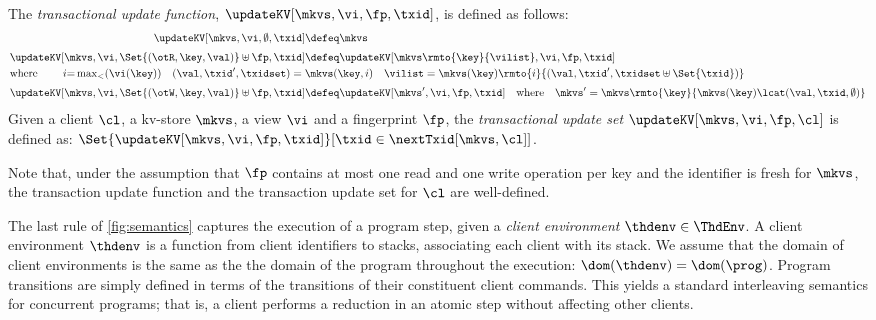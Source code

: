 \begin{definition}
\label{eq:updatekv}
\label{def:updatekv}
The \emph{transactional update function},  $\updateKV[\mkvs, \vi, \fp, \txid]$,  is
defined as follows:
%
{%
\[%
\begin{aligned}
    \updateKV[\mkvs, \vi, \emptyset, \txid] & \defeq \mkvs 
    \\[3pt]
    \updateKV[\mkvs, \vi, \Set{(\otR, \key, \val)} \uplus \fp, \txid]
    & \defeq \updateKV[\mkvs\rmto{\key}{\vilist},\vi, \fp, \txid] \\
    \omit\rlap{where \qquad \( i {=} \max_{<}(\vi(\key)) \quad (\val, \txid', \txidset) = \mkvs(\key, i) 
            \quad \vilist = \mkvs(\key)\rmto{i}{(\val, \txid', \txidset \uplus \Set{ \txid })}\)} 
    \\[3pt]
%	
	\updateKV[\mkvs, \vi, \Set{(\otW, \key, \val)} \uplus \fp, \txid] 
    & \defeq \updateKV[\mkvs', \vi, \fp, \txid] \quad \text{where} \quad  \mkvs' = \mkvs\rmto{\key}{ \mkvs(\key) \lcat (\val, \txid, \emptyset) } \\
\end{aligned}
\]%
}%
%
Given a client $\cl$, a kv-store $\mkvs$, a view $\vi$ and a fingerprint $\fp$, 
the \emph{transactional update set} $\updateKV[\mkvs, \vi, \fp, \cl]$ is defined as:  
\(\Set{\updateKV[\mkvs, \vi, \fp, \txid]}[\txid \in \nextTxid[\mkvs, \cl]]\).
\end{definition}

Note that,  under the assumption that $\fp$ contains at most one read and one write 
operation per key and the identifier is fresh for $\mkvs$, 
the transaction update function and the transaction update set for
$\cl$ are well-defined. 

The last rule of \cref{fig:semantics} captures the execution of a program step, 
given a \emph{client environment} $\thdenv \in \ThdEnv$. 
A client environment $\thdenv$ is a function from client identifiers to stacks, associating each client with its stack. 
We assume that the domain of client environments is the same as the
the domain of the program throughout the execution: 
$\dom(\thdenv) = \dom(\prog)$.
Program transitions are simply defined in terms of the transitions of
their constituent client commands. 
This  yields a  standard interleaving semantics for concurrent
programs; 
that is, 
a client performs a reduction in an atomic step without
affecting other clients. 
